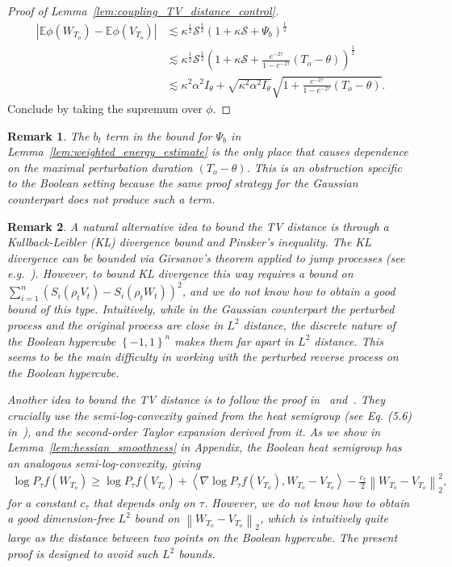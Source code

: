 \documentclass[11pt]{article}
\newcommand{\excess}{\alpha}
\newcommand{\cS}{\mathcal{S}}
\newcommand{\btau}{\kappa}
\newcommand{\uV}{V}
\newcommand{\uW}{W}
\newcommand{\To}{{T_o}}
\theoremstyle{named}
\theoremstyle{plain}
\newtheorem{remark}{Remark}
\newcommand{\Exs}{\ensuremath{{\mathbb{E}}}}
\newcommand{\parenth}[1]{\left( #1 \right)}
\newcommand{\braces}[1]{\left\{ #1 \right \}}
\newcommand{\abss}[1]{\left| #1 \right |}
\newcommand{\angles}[1]{\left\langle #1 \right \rangle}
\newcommand{\vecnorm}[2]{\left\| #1\right\|_{#2}}
\begin{document}
\begin{proof}[Proof of Lemma~\ref{lem:coupling_TV_distance_control}]
  \begin{align*}
    \abss{\Exs \phi(\uW_{\To}) - \Exs \phi(\uV_{\To})} &\lesssim \btau^{\frac12} \cS^{\frac12} \parenth{1 + \btau \cS + \Psi_b}^{\frac12} \\
    &\lesssim \btau^{\frac12} \cS^{\frac12} \parenth{1 + \btau \cS + \frac{e^{-2\tau}}{1-e^{-2\tau}} (\To - \theta) }^{\frac12} \\
    &\lesssim \btau^2 \excess^2 I_\theta + \sqrt{\btau^2 \excess^2 I_\theta}\sqrt{1 + \frac{e^{-2\tau}}{1-e^{-2\tau}} (\To - \theta)}.
  \end{align*}
  Conclude by taking the supremum over $\phi$.


\end{proof}


\begin{remark}
  The $b_t$ term in the bound for $\Psi_b$ in Lemma~\ref{lem:weighted_energy_estimate} is the only place that causes dependence on the maximal perturbation duration $\parenth{\To - \theta}$. This is an obstruction specific to the Boolean setting because the same proof strategy for the Gaussian counterpart does not produce such a term.
\end{remark}
\begin{remark}\label{rmk:remark_after_lem2}
  A natural alternative idea to bound the TV distance is through a Kullback-Leibler (KL) divergence bound and Pinsker's inequality. The KL divergence can be bounded via Girsanov's theorem applied to jump processes (see e.g.~\cite{leonard2012girsanov}). However, to bound KL divergence this way requires a bound on $\sum_{i=1}^n \parenth{S_i(\rho_t \uV_t) - S_i(\rho_t \uW_t)}^2$, and we do not know how to obtain a good bound of this type. Intuitively, while in the Gaussian counterpart the perturbed process and the original process are close in $L^2$ distance, the discrete nature of the Boolean hypercube $\braces{-1,1}^n$ makes them far apart in $L^2$ distance. This seems to be the main difficulty in working with the perturbed reverse process on the Boolean hypercube. 
  
  Another idea to bound the TV distance is to follow the proof in~\cite{eldan2018regularization} and~\cite{lehec2016regularization}. They crucially use the semi-log-convexity gained from the heat semigroup (see Eq. (5.6) in~\cite{lehec2016regularization}), and the second-order Taylor expansion derived from it. As we show in Lemma~\ref{lem:hessian_smoothness} in Appendix, the Boolean heat semigroup has an analogous semi-log-convexity, giving
  \begin{align*}
    \log P_\tau f(\uW_{\To}) \geq \log P_\tau f(\uV_{\To}) + \angles{\nabla \log P_\tau f (\uV_{\To}), \uW_{\To} -\uV_{\To}} - \frac{c_\tau}{2} \vecnorm{\uW_{\To} - \uV_{\To}}{2}^2,
  \end{align*}
  for a constant $c_\tau$ that depends only on $\tau$. However, we do not know how to obtain a good dimension-free $L^2$ bound on $\vecnorm{\uW_{\To} - \uV_{\To}}{2}$, which is intuitively quite large as the distance between two points on the Boolean hypercube. The present proof is designed to avoid such $L^2$ bounds.
\end{remark}
\end{document}
